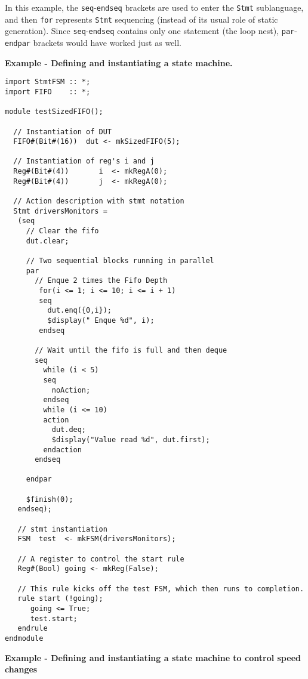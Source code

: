 In this example, the \texttt{seq}-\texttt{endseq} brackets are used to enter
the \texttt{Stmt} sublanguage, and then \texttt{for} represents \texttt{Stmt}
sequencing (instead of its usual role of static generation).  Since
\texttt{seq}-\texttt{endseq} contains only one statement (the loop nest),
\texttt{par}-\texttt{endpar} brackets would have worked just as well.

{\bf Example -  Defining and instantiating a state machine.}
\begin{verbatim}
import StmtFSM :: *;
import FIFO    :: *;

module testSizedFIFO();

  // Instantiation of DUT
  FIFO#(Bit#(16))  dut <- mkSizedFIFO(5);

  // Instantiation of reg's i and j
  Reg#(Bit#(4))       i  <- mkRegA(0);
  Reg#(Bit#(4))       j  <- mkRegA(0);  

  // Action description with stmt notation
  Stmt driversMonitors =
   (seq
     // Clear the fifo
     dut.clear;

     // Two sequential blocks running in parallel 
     par
       // Enque 2 times the Fifo Depth
        for(i <= 1; i <= 10; i <= i + 1)
        seq
          dut.enq({0,i});
          $display(" Enque %d", i);
        endseq

       // Wait until the fifo is full and then deque
       seq
         while (i < 5)
         seq
           noAction;        
         endseq
         while (i <= 10)
         action
           dut.deq;
           $display("Value read %d", dut.first);
         endaction
       endseq
       
     endpar
   
     $finish(0);
   endseq);

   // stmt instantiation
   FSM  test  <- mkFSM(driversMonitors);

   // A register to control the start rule
   Reg#(Bool) going <- mkReg(False);

   // This rule kicks off the test FSM, which then runs to completion.
   rule start (!going);
      going <= True;
      test.start;
   endrule
endmodule
\end{verbatim}




{\bf Example - Defining and instantiating a state machine to control
speed changes}

